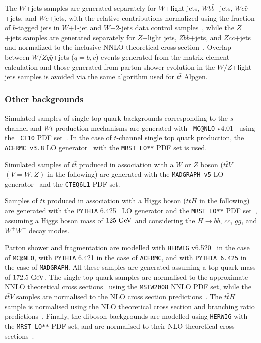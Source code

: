 The $W$+jets samples are generated separately for $W$+light jets, 
$Wb\bar{b}$+jets, $Wc\bar{c}$+jets, and $Wc$+jets, 
with the relative contributions normalized using the fraction 
of $b$-tagged jets in $W$+1-jet and $W$+2-jets data 
control samples~\cite{whf}, while
the $Z$+jets samples are generated separately 
for $Z$+light jets, $Zb\bar{b}$+jets, and $Zc\bar{c}$+jets and
normalized to the inclusive NNLO theoretical cross section~\cite{vjetsxs}.
Overlap between $W/Zq\bar{q}$+jets ($q=b,c$) 
events generated from the matrix element calculation and those
generated from parton-shower evolution in the $W/Z$+light jets
samples is avoided via the same algorithm used
for $t\bar{t}$ Alpgen.

\subsubsection{Other backgrounds}\label{subsec:otherbkg}
Simulated samples of single top quark backgrounds corresponding to the
$s$-channel and $Wt$ production mechanisms are generated with {\tt
MC@NLO} v4.01~\cite{mcatnlo_1,mcatnlo_2,mcatnlo_3} using the {\tt
CT10} PDF set~\cite{ct10}.  In the case of $t$-channel single top
quark production, the {\tt ACERMC v3.8} LO generator~\cite{acermc}
with the {\tt MRST LO**} PDF set is used.

Simulated samples of $t\bar{t}$ produced in association with a $W$ or $Z$ boson
($t\bar{t}V$ $(V=W,Z)$ in the following) are generated with the {\tt MADGRAPH v5} LO
generator~\cite{madgraph} and the {\tt CTEQ6L1} PDF set.  

Samples of $t\bar{t}$ produced in association with a Higgs boson
($t\bar{t}H$ in the following) are generated with the 
{\tt PYTHIA} 6.425~\cite{py6} LO generator and the {\tt MRST LO**} PDF set~\cite{mrst},
assuming a Higgs boson mass of $125\gev$ and considering the 
$H\to b\bar{b}$, $c\bar{c}$, $gg$, and $W^+W^-$ decay modes.

Parton shower and fragmentation are modelled with {\tt HERWIG}
v6.520~\cite{HERWIG} in the case of {\tt MC@NLO}, with {\tt PYTHIA}
6.421 in the case of {\tt ACERMC}, and with {\tt PYTHIA 6.425} in the
case of {\tt MADGRAPH}.  All these samples are generated assuming a top
quark mass of $172.5\gev$. The single top quark samples are normalised to
the approximate NNLO theoretical cross sections~\cite{stopxs,stopxs_2}
using the {\tt MSTW2008} NNLO PDF set, while the $t\bar{t}V$ samples
are normalised to the NLO cross section predictions~\cite{ttbarVxs1,ttbarVxs2}.
The $t\bar{t}H$ sample is normalised using the NLO theoretical cross section 
and branching ratio predictions~\cite{lhcxs}.
Finally, the diboson backgrounds are modelled using {\tt HERWIG} with
the {\tt MRST LO**} PDF set, and are normalised to their NLO
theoretical cross sections~\cite{dibosonxs}.

